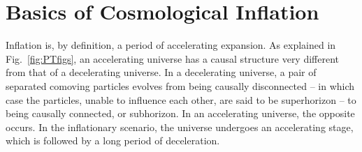 
\section{Basics of Cosmological Inflation}

Inflation is, by definition, a period of accelerating expansion. As explained in Fig.~\ref{fig:PTfigs}, an accelerating universe has a causal structure very different from that of a decelerating universe. In a decelerating universe, a pair of separated comoving particles evolves from being causally disconnected -- in which case the particles, unable to influence each other, are said to be superhorizon -- to being causally connected, or subhorizon. In an accelerating universe, the opposite occurs. In the inflationary scenario, the universe undergoes an accelerating stage, which is followed by a long period of deceleration.


